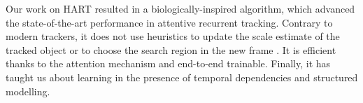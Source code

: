     
    Our work on HART resulted in a biologically-inspired algorithm, which advanced the state-of-the-art performance in attentive recurrent tracking. Contrary to modern trackers, it does not use heuristics to update the scale estimate of the tracked object or to choose the search region in the new frame \citep{Bertinetto2016,Held2016}. It is efficient thanks to the attention mechanism and end-to-end trainable. Finally, it has taught us about learning in the presence of temporal dependencies and structured modelling. 
    
